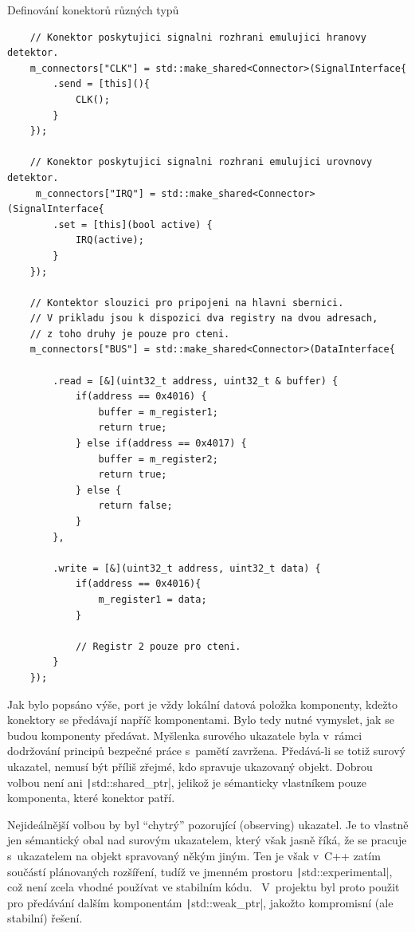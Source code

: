 \begin{listing}
	\caption{Definování konektorů různých typů}
	\label{list:use-konfigurace-konektoru}
	\begin{verbatim}
	// Konektor poskytujici signalni rozhrani emulujici hranovy detektor.
    m_connectors["CLK"] = std::make_shared<Connector>(SignalInterface{
		.send = [this](){
			CLK();
		}
	});
	
	// Konektor poskytujici signalni rozhrani emulujici urovnovy detektor.
	 m_connectors["IRQ"] = std::make_shared<Connector>(SignalInterface{
		.set = [this](bool active) {
			IRQ(active);
		}
	});
	
	// Kontektor slouzici pro pripojeni na hlavni sbernici.
	// V prikladu jsou k dispozici dva registry na dvou adresach,
	// z toho druhy je pouze pro cteni.
	m_connectors["BUS"] = std::make_shared<Connector>(DataInterface{

		.read = [&](uint32_t address, uint32_t & buffer) {
			if(address == 0x4016) {
				buffer = m_register1;
				return true;
			} else if(address == 0x4017) {
				buffer = m_register2;
				return true;
			} else {
				return false;
			}
		},
	
		.write = [&](uint32_t address, uint32_t data) {
			if(address == 0x4016){
				m_register1 = data;
			}
		
			// Registr 2 pouze pro cteni.
		}
	});
	\end{verbatim}
\end{listing}

\begin{note}
	Jak bylo popsáno výše, port je vždy lokální datová položka komponenty, kdežto konektory se předávají napříč komponentami. Bylo tedy nutné vymyslet, jak se budou komponenty předávat. Myšlenka surového ukazatele byla v~rámci dodržování principů bezpečné práce s~pamětí zavržena. Předává-li se totiž surový ukazatel, nemusí být příliš zřejmé, kdo spravuje ukazovaný objekt. Dobrou volbou není ani \texttt|std::shared_ptr|, jelikož je sémanticky vlastníkem pouze komponenta, které konektor patří.
	
	 Nejideálnější volbou by byl \enquote{chytrý} pozorující (observing) ukazatel. Je to vlastně jen sémantický obal nad surovým ukazatelem, který však jasně říká, že se pracuje s~ukazatelem na objekt spravovaný někým jiným. Ten je však v~C++ zatím součástí plánovaných rozšíření, tudíž ve jmenném prostoru \texttt|std::experimental|, což není zcela vhodné používat ve stabilním kódu.~\cite{Brown2014:observing-ptr} V~projektu byl proto použit pro předávání dalším komponentám \texttt|std::weak_ptr|, jakožto kompromisní (ale stabilní) řešení.
\end{note}

